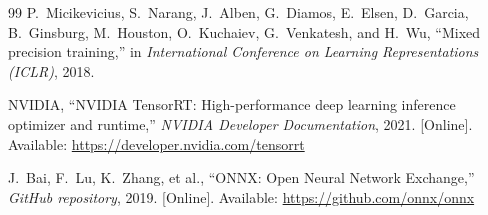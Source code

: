 \documentclass[11pt,a4paper]{article}
\begin{document}
\begin{thebibliography}{99}
P.~Micikevicius, S.~Narang, J.~Alben, G.~Diamos, E.~Elsen, D.~Garcia, B.~Ginsburg, M.~Houston, O.~Kuchaiev, G.~Venkatesh, and H.~Wu, ``Mixed precision training,'' in \emph{International Conference on Learning Representations (ICLR)}, 2018.

NVIDIA, ``NVIDIA TensorRT: High-performance deep learning inference optimizer and runtime,'' \emph{NVIDIA Developer Documentation}, 2021. [Online]. Available: \url{https://developer.nvidia.com/tensorrt}

J.~Bai, F.~Lu, K.~Zhang, et al., ``ONNX: Open Neural Network Exchange,'' \emph{GitHub repository}, 2019. [Online]. Available: \url{https://github.com/onnx/onnx}

\end{thebibliography}
\endgroup
\end{document}
